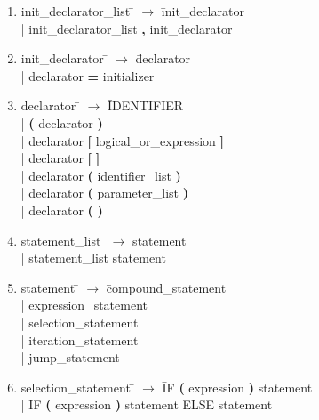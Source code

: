 \documentclass[11pt]{article}
\begin{document}
\begin{enumerate}
\item \begin{tabbing} init{\_}declarator{\_}list \= $\to$ \= init{\_}declarator \\
	\> | \> init{\_}declarator{\_}list \textbf{,} init{\_}declarator
\end{tabbing}

\item \begin{tabbing} init{\_}declarator \= $\to$ \= declarator \\
	\> | \> declarator \textbf{=} initializer
\end{tabbing}

\item \begin{tabbing} declarator \= $\to$ \= IDENTIFIER \\
	\> | \> \textbf{(} declarator \textbf{)} \\
	\> | \> declarator \textbf{[} logical{\_}or{\_}expression \textbf{]} \\
	\> | \> declarator \textbf{[} \textbf{]} \\
	\> | \> declarator \textbf{(} identifier{\_}list \textbf{)} \\
	\> | \> declarator \textbf{(} parameter{\_}list \textbf{)} \\
	\> | \> declarator \textbf{(} \textbf{)}
\end{tabbing}

\item \begin{tabbing} statement{\_}list \= $\to$ \= statement \\
	\> | \> statement{\_}list statement
\end{tabbing}

\item \begin{tabbing} statement \= $\to$ \= compound{\_}statement \\
	\> | \> expression{\_}statement \\
	\> | \> selection{\_}statement \\
	\> | \> iteration{\_}statement \\
	\> | \> jump{\_}statement
\end{tabbing}

\item \begin{tabbing} selection{\_}statement \= $\to$ \= IF \textbf{(} expression \textbf{)} statement \\
	\> | \> IF \textbf{(} expression \textbf{)} statement ELSE statement
\end{tabbing}


\end{enumerate}
\end{document}
